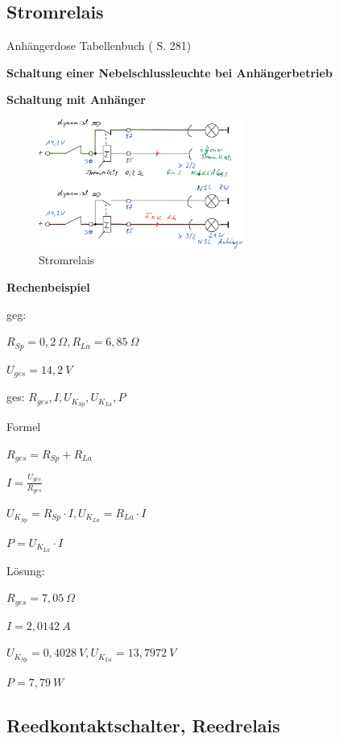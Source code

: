 \subsection{Stromrelais}\label{stromrelais}

Anhängerdose Tabellenbuch (\textcite{bell:2021:tabellenbuchKfz} S. 281)

\textbf{Schaltung einer Nebelschlussleuchte bei Anhängerbetrieb}

\textbf{Schaltung mit Anhänger}

\begin{figure}[!ht]%
\centering
\includegraphics[width=0.6\textwidth]{images/Skizze/10_Stromrelais_Skizze.pdf}
\caption{Stromrelais}
\end{figure}

\textbf{Rechenbeispiel}

geg:

$R_{Sp} = 0,2~\Omega, R_{La} = 6,85~\Omega$

$U_{ges} = 14,2~V$

ges: $R_{ges}, I, U_{K_{Sp}}, U_{K_{La}}, P$

Formel

$R_{ges} = R_{Sp} + R_{La}$

$I = \frac{U_{ges}}{R_{ges}}$

$U_{K_{Sp}} = R_{Sp} \cdot I, U_{K_{La}} = R_{La} \cdot I$

$P = U_{K_{La}} \cdot I$

Lösung:

$R_{ges} = 7,05~\Omega$

$I = 2,0142~A$

$U_{K_{Sp}} = 0,4028~V, U_{K_{La}} = 13,7972~V$

$P = 7,79~W$

\subsection{Reedkontaktschalter,
Reedrelais}\label{reedkontaktschalter-reedrelais}

